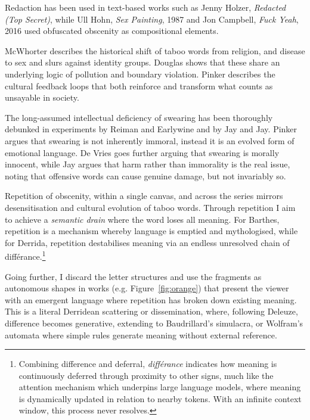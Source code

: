 \documentclass[12pt]{article}
\begin{document}
Redaction has been used in text-based works such as Jenny Holzer,
\emph{Redacted (Top Secret)}, while Ull Hohn, \emph{Sex Painting},
1987 and Jon Campbell, \emph{Fuck Yeah}, 2016 used obfuscated obscenity
as compositional elements.

McWhorter describes the historical shift of taboo words from religion,
and disease to sex and slurs against identity
groups.\cite{mcwhorter2024nine} Douglas shows that these share an
underlying logic of pollution and boundary violation.\cite{douglas1966purity}
Pinker describes the cultural feedback loops that both reinforce and
transform what counts as unsayable in society\cite{pinker2008seven}.

The long-assumed intellectual deficiency of swearing has been
thoroughly debunked in experiments by Reiman and
Earlywine\cite{reiman2022swearfluency} and by Jay and
Jay.\cite{jay2015taboo} Pinker argues that
swearing is not inherently immoral, instead it is an evolved form of
emotional language.\cite{pinker2017moral} De Vries goes further arguing that swearing is
morally innocent,\cite{devries2023swearing} while Jay argues that harm
rather than immorality is the real issue, noting that offensive words
can cause genuine damage, but not invariably so.\cite{jay2009offensive}

Repetition of obscenity, within a single canvas, and across the series
mirrors desensitisation and cultural evolution of taboo words.
Through repetition I aim to achieve a \emph{semantic drain} where the
word loses all meaning. For Barthes, repetition is a mechanism whereby
language is emptied and mythologised,\cite{barthes1957mythologies}
while for Derrida,\cite{derrida1972dissemination} repetition
destabilises meaning via an endless unresolved chain of
diff\'erance.\footnote{Combining difference and deferral,
  \emph{diff\'erance} indicates how meaning is continuously deferred
  through proximity to other signs, much like the attention mechanism
  which underpins large language models, where meaning is dynamically
  updated in relation to nearby tokens. With an infinite context
  window, this process never resolves.}

Going further, I discard the letter structures and use the fragments
as autonomous shapes in works (e.g. Figure~\ref{fig:orange}) that
present the viewer with an emergent language where repetition has
broken down existing meaning. This is a literal Derridean scattering
or dissemination,\cite{derrida1972dissemination} where, following
Deleuze,\cite{deleuze1968difference} difference becomes generative,
extending to Baudrillard's simulacra,\cite{baudrillard1981simulacra}
or Wolfram's automata\cite{wolfram} where simple rules generate
meaning without external reference.
\end{document}
